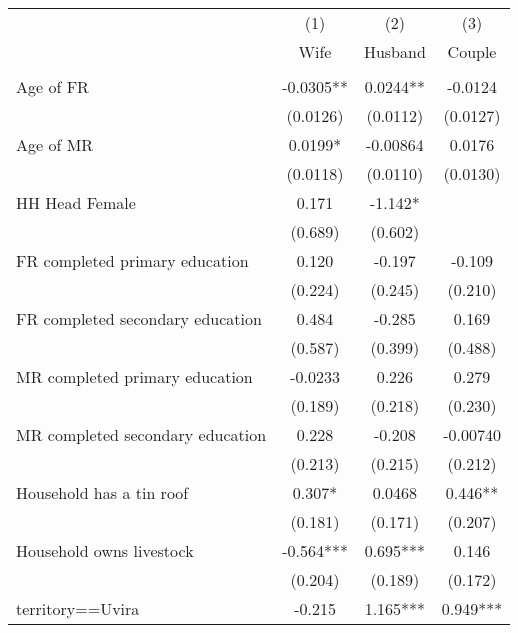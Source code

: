 {
\def\sym#1{\ifmmode^{#1}\else\(^{#1}\)\fi}
\begin{tabular}{l*{3}{c}}
\hline\hline
                    &\multicolumn{1}{c}{(1)}   &\multicolumn{1}{c}{(2)}   &\multicolumn{1}{c}{(3)}   \\
                    &        Wife   &     Husband   &      Couple   \\
\hline
                    &               &               &               \\
Age of FR           &     -0.0305** &      0.0244** &     -0.0124   \\
                    &    (0.0126)   &    (0.0112)   &    (0.0127)   \\
[1em]
Age of MR           &      0.0199*  &    -0.00864   &      0.0176   \\
                    &    (0.0118)   &    (0.0110)   &    (0.0130)   \\
[1em]
HH Head Female      &       0.171   &      -1.142*  &            \\
                    &     (0.689)   &     (0.602)   &            \\
[1em]
FR completed primary education&       0.120   &      -0.197   &      -0.109   \\
                    &     (0.224)   &     (0.245)   &     (0.210)   \\
[1em]
FR completed secondary education&       0.484   &      -0.285   &       0.169   \\
                    &     (0.587)   &     (0.399)   &     (0.488)   \\
[1em]
MR completed primary education&     -0.0233   &       0.226   &       0.279   \\
                    &     (0.189)   &     (0.218)   &     (0.230)   \\
[1em]
MR completed secondary education&       0.228   &      -0.208   &    -0.00740   \\
                    &     (0.213)   &     (0.215)   &     (0.212)   \\
[1em]
Household has a tin roof&       0.307*  &      0.0468   &       0.446** \\
                    &     (0.181)   &     (0.171)   &     (0.207)   \\
[1em]
Household owns livestock&      -0.564***&       0.695***&       0.146   \\
                    &     (0.204)   &     (0.189)   &     (0.172)   \\
[1em]
territory==Uvira    &      -0.215   &       1.165***&       0.949***\\

\end{tabular}}
